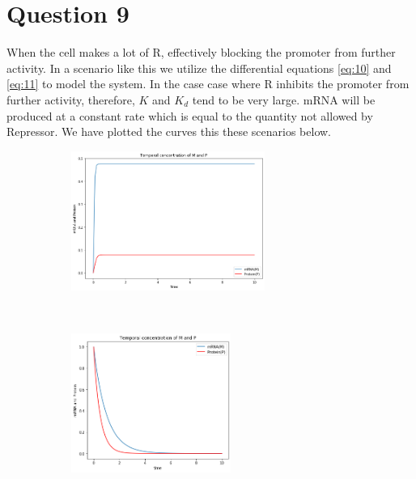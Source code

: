 \documentclass[12pt,a4paper]{article}
\begin{document}
\section*{Question 9}
When the cell makes a lot of R,  effectively blocking the promoter from further activity.
In  a scenario like this we utilize the differential equations  \eqref{eq:10}  and \eqref{eq:11} to model the system. 
In the case case where R inhibits the promoter from further activity, therefore,  $K$ and $K_d$ tend to be very large. mRNA  will be produced at a constant rate which is equal to the quantity not allowed by Repressor. 
We have plotted the curves this these scenarios below.
\begin{figure}[th!]
    \centering
    \begin{subfigure}[t]{0.5\textwidth}
        \centering
        \includegraphics[height=1.8in]{./gaphics/q_9.png}
    \end{subfigure}%
    ~ 
    \begin{subfigure}[t]{0.5\textwidth}
        \centering
        \includegraphics[height=1.8in]{./gaphics/q_9b.png}
    \end{subfigure}
    \caption{}
\end{figure}
\end{document}
